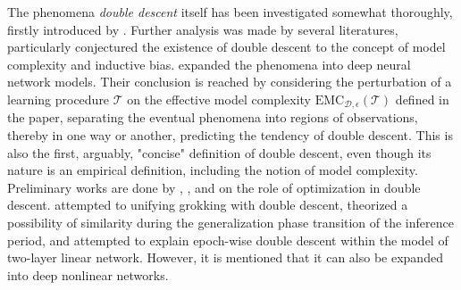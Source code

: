 \documentclass[10pt,oneside,oldfontcommands,dvipsnames,article]{memoir}
\begin{document}
The phenomena \textit{double descent} itself has been investigated somewhat thoroughly, firstly introduced by \cite{belkin_reconciling_2019}. Further analysis was made by several literatures, particularly conjectured the existence of double descent to the concept of model complexity and inductive bias. \cite{nakkiran_deep_2019} expanded the phenomena into deep neural network models. Their conclusion is reached by considering the perturbation of a learning procedure $\mathcal{T}$ on the effective model complexity $\mathrm{EMC}_{\mathcal{D},\epsilon}(\mathcal{T})$ defined in the paper, separating the eventual phenomena into regions of observations, thereby in one way or another, predicting the tendency of double descent. This is also the first, arguably, "concise" definition of double descent, even though its nature is an empirical definition, including the notion of model complexity. Preliminary works are done by \cite{lafon_understanding_2024}, \cite{schaeffer_double_2023}, and \cite{liu2023understandingroleoptimizationdouble} on the role of optimization in double descent. \cite{davies_unifying_2023} attempted to unifying grokking with double descent, theorized a possibility of similarity during the generalization phase transition of the inference period, and \cite{olmin2024understandingepochwisedoubledescent} attempted to explain epoch-wise double descent within the model of two-layer linear network. However, it is mentioned that it can also be expanded into deep nonlinear networks. 
\end{document}
